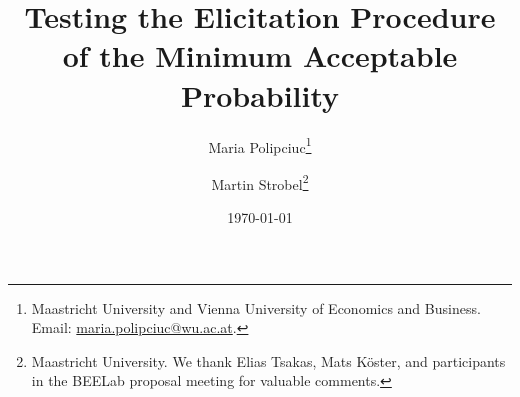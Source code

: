 
\title{Testing the Elicitation Procedure \\ of the Minimum Acceptable Probability}
\author{Maria Polipciuc\thanks{Maastricht University and Vienna University of Economics and Business. Email: \url{maria.polipciuc@wu.ac.at}.} \and Martin Strobel\thanks{Maastricht University. We thank Elias Tsakas, Mats K\"{o}ster, and participants in the BEELab proposal meeting for valuable comments.}}
\date{\today	\vspace{1cm}}
\titlepage



\begin{titlepage}
\clearpage
\maketitle
\thispagestyle{empty}


\begin{abstract}
%
%


\end{abstract}
\end{titlepage}
